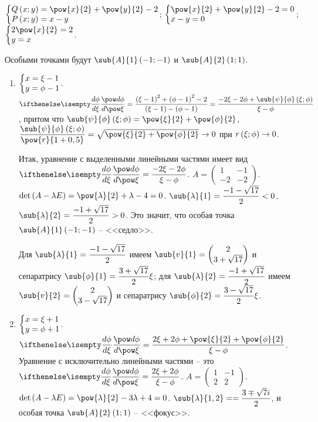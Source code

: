 \documentclass[a5paper,10pt]{article}
\begin{document}
$\tsys{
    Q\br{x; y} = \pow{x}{2} + \pow{y}{2} - 2
    \\ P\br{x; y} = x - y
}$;
$\tsys{
\pow{x}{2} + \pow{y}{2} - 2 = 0
\\ x - y = 0
}$;
$\tsys{
2\pow{x}{2} = 2
\\ y = x
}$.

Особыми точками будут $\sub{A}{1}\br{-1; -1}$ и $\sub{A}{2}\br{1; 1}$.

\begin{enumerate}[label = \arabic*)]
    \item $\tsys{x = \xi - 1 \\ y = \phi - 1}$.
    $\der{\phi}{\xi}
    = \dfrac {\br{\xi - 1}^2 + \br{\phi - 1}^2 - 2} {\br{\xi - 1} - \br{\phi - 1}}
    = \dfrac {-2\xi - 2\phi + \sub{\psi}{\phi}\br{\xi; \phi}} {\xi - \phi}$,
    притом что
    $\sub{\psi}{\phi}\br{\xi; \phi} = \pow{\xi}{2} + \pow{\phi}{2}$,
    $\dfrac {\sub{\psi}{\phi}\br{\xi; \phi}} {\pow{r}{1 + 0,5}} = \sqrt{\pow{\xi}{2} 
    + \pow{\phi}{2}} \to 0$ при $r\left(\hspace{0.01em}\xi; \phi\hspace{0.01em}\right) \to 0$.
    
    Итак, уравнение с выделенными линейными частями имеет вид
    $\der{\phi}{\xi} = \dfrac {-2\xi - 2\phi} {\xi - \phi}$.
    $A = \begin{pmatrix} 1 & -1 \\ -2 & -2 \end{pmatrix}$.
    $\det\br{A - \lambda E} = \pow{\lambda}{2} + \lambda - 4 = 0$.
    $\sub{\lambda}{1} = \dfrac {-1 - \sqrt{17}} {2} < 0$, 
    $\sub{\lambda}{2} = \dfrac {-1 + \sqrt{17}} {2} > 0$.
    Это значит, что особая точка $\sub{A}{1}\br{-1; -1}$ -- <<седло>>.
    
    Для $\sub{\lambda}{1} = \dfrac {-1 - \sqrt{17}} {2}$ имеем
    $\sub{v}{1} = \begin{pmatrix} 2 \\ 3 + \sqrt{17} \end{pmatrix}$
    и сепаратрису $\sub{\phi}{1} = \dfrac {3 + \sqrt{17}} {2} \xi$;
    для $\sub{\lambda}{2} = \dfrac {-1 + \sqrt{17}} {2}$ имеем
    $\sub{v}{2} = \begin{pmatrix} 2 \\ 3 - \sqrt{17} \end{pmatrix}$
    и сепаратрису $\sub{\phi}{2} = \dfrac {3 - \sqrt{17}} {2} \xi$.
    
    \item $\tsys{
        x = \xi + 1 \\
        y = \phi + 1
    }$.
    $\der{\phi}{\xi}
    = \dfrac {2\xi + 2\phi + \pow{\xi}{2} + \pow{\phi}{2}} {\xi - \phi}$.
    Уравнение с исключительно линейными частями -- это 
    $\der{\phi}{\xi} = \dfrac {2\xi + 2\phi} {\xi - \phi}$.
    $A = \begin{pmatrix} 1 & -1 \\ 2 & 2 \end{pmatrix}$.
    $\det\br{A - \lambda E} = \pow{\lambda}{2} - 3\lambda + 4 = 0$.
    $\sub{\lambda}{1, 2} = \linebreak = \dfrac {3 \mp \sqrt{7} i} {2}$,
    и особая точка $\sub{A}{2}\br{1; 1}$ -- <<фокус>>.
\end{enumerate}
\end{document}
